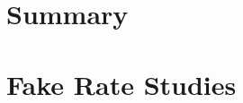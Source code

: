 \documentclass{cmspaper}
\begin{document}
\section{Summary}
    \label{sec:summary}
    


\clearpage
\appendix
\appendixpage
  \section{Fake Rate Studies}
     \label{app:fake_rate_studies}
     
     

%  
\end{document}
